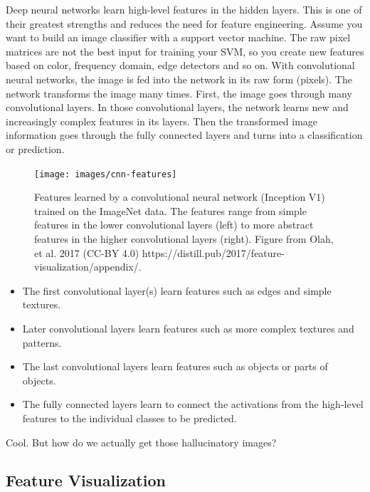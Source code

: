 \documentclass[
  12pt,
]{krantz}
\providecommand{\tightlist}{%
  \setlength{\itemsep}{0pt}\setlength{\parskip}{0pt}}
\begin{document}
Deep neural networks learn high-level features in the hidden layers.
This is one of their greatest strengths and reduces the need for feature engineering.
Assume you want to build an image classifier with a support vector machine.
The raw pixel matrices are not the best input for training your SVM, so you create new features based on color, frequency domain, edge detectors and so on.
With convolutional neural networks, the image is fed into the network in its raw form (pixels).
The network transforms the image many times.
First, the image goes through many convolutional layers.
In those convolutional layers, the network learns new and increasingly complex features in its layers.
Then the transformed image information goes through the fully connected layers and turns into a classification or prediction.

\begin{figure}

{\centering \texttt{[image: images/cnn-features]} 

}

\caption{Features learned by a convolutional neural network (Inception V1) trained on the ImageNet data. The features range from simple features in the lower convolutional layers (left) to more abstract features in the higher convolutional layers (right). Figure from Olah, et al. 2017 (CC-BY 4.0) https://distill.pub/2017/feature-visualization/appendix/.}\label{fig:unnamed-chunk-53}
\end{figure}

\begin{itemize}
\tightlist
\item
  The first convolutional layer(s) learn features such as edges and simple textures.
\item
  Later convolutional layers learn features such as more complex textures and patterns.
\item
  The last convolutional layers learn features such as objects or parts of objects.
\item
  The fully connected layers learn to connect the activations from the high-level features to the individual classes to be predicted.
\end{itemize}

Cool.
But how do we actually get those hallucinatory images?

\hypertarget{feature-visualization}{%
\subsection{Feature Visualization}\label{feature-visualization}}
\end{document}
